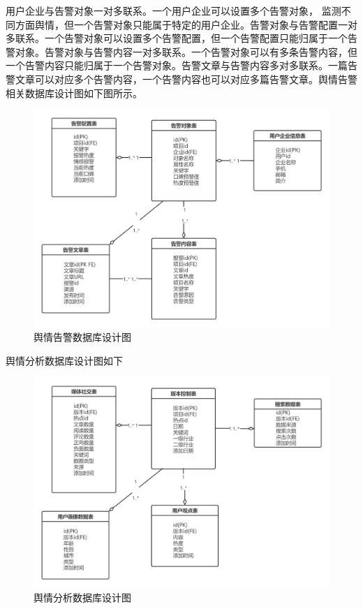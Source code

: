 用户企业与告警对象一对多联系。一个用户企业可以设置多个告警对象， 监测不同方面舆情，但一个告警对象只能属于特定的用户企业。告警对象与告警配置一对多联系。一个告警对象可以设置多个告警配置，但一个告警配置只能归属于一个告警对象。告警对象与告警内容一对多联系。一个告警对象可以有多条告警内容，但一个告警内容只能归属于一个告警对象。告警文章与告警内容多对多联系。一篇告警文章可以对应多个告警内容，一个告警内容也可以对应多篇告警文章。舆情告警相关数据库设计图如下图所示。

\begin{figure}[!htbp]
	\centering
	\includegraphics[scale=1.2]{image/d1.png}
	\caption{舆情告警数据库设计图}
\end{figure}

舆情分析数据库设计图如下

\begin{figure}[!htbp]
	\centering
	\includegraphics[scale=1.2]{image/d2.png}
	\caption{舆情分析数据库设计图}
\end{figure}
